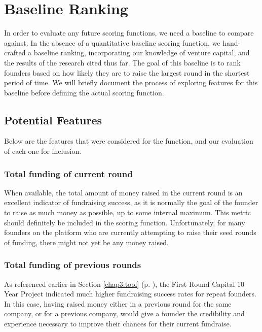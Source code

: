 \section{Baseline Ranking}

In order to evaluate any future scoring functions, we need a baseline to compare against. In the absence of a quantitative baseline scoring function, we hand-crafted a baseline ranking, incorporating our knowledge of venture capital, and the results of the research cited thus far. The goal of this baseline is to rank founders based on how likely they are to raise the largest round in the shortest period of time. We will briefly document the process of exploring features for this baseline before defining the actual scoring function.

\subsection{Potential Features}

Below are the features that were considered for the function, and our evaluation of each one for inclusion.

\subsubsection{Total funding of current round}

When available, the total amount of money raised in the current round is an excellent indicator of fundraising success, as it is normally the goal of the founder to raise as much money as possible, up to some internal maximum. This metric should definitely be included in the scoring function. Unfortunately, for many founders on the platform who are currently attempting to raise their seed rounds of funding, there might not yet be any money raised.

\subsubsection{Total funding of previous rounds}

As referenced earlier in Section \ref{chap3:tool} (p. \pageref{chap3:tool}), the First Round Capital 10 Year Project \cite{first-round-10-years} indicated much higher fundraising success rates for repeat founders. In this case, having raised money either in a previous round for the same company, or for a previous company, would give a founder the credibility and experience necessary to improve their chances for their current fundraise.

